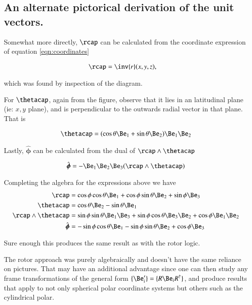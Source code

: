 \documentclass{article}
\newcommand{\phicap}[0]{\hat{\boldsymbol{\phi}}}
\begin{document}
\subsection{ An alternate pictorical derivation of the unit vectors. }

Somewhat more directly, $\rcap$ can be calculated from the coordinate expression of equation \ref{eqn:coordinates}

\begin{align*}
\rcap 
&= \inv{r} (x, y, z),
\end{align*}

which was found by inspection of the diagram.

For $\thetacap$, again from the figure, observe that it lies in an
latitudinal plane (ie: $x,y$ plane), and is perpendicular to the outwards radial vector in that plane.  That is

\begin{align*}
\thetacap 
&= (\cos\theta \Be_1 + \sin\theta \Be_2) \Be_1 \Be_2 \\
\end{align*}

Lastly, $\phicap$ can be calculated from the dual of $\rcap \wedge \thetacap$

\begin{align*}
\phicap 
&= - \Be_1 \Be_2 \Be_3 (\rcap \wedge \thetacap) \\
\end{align*}

Completing the algebra for the expressions above we have
\begin{align}
\rcap 
&=
\cos\phi \cos\theta \Be_1
+ \cos\phi \sin\theta \Be_2
+ \sin\phi \Be_3 \\
\thetacap 
&= \cos\theta \Be_2 - \sin\theta \Be_1 \\
\rcap \wedge \thetacap 
&=
\sin\phi \sin\theta \Be_1 \Be_3 
+ \sin\phi \cos\theta \Be_3 \Be_2 
+ \cos\phi \Be_1 \Be_2 \\
\phicap 
&=
- \sin\phi \cos\theta \Be_1 
- \sin\phi \sin\theta \Be_2 
+ \cos\phi \Be_3 %
\end{align}

Sure enough this produces the same result as with the rotor logic.

The rotor approach was purely algebraically and doesn't have
the same reliance on pictures.  That may have
an 
additional advantage
since one can then 
study any frame transformations of the general form $\{\Be_i'\} = \{ R \Be_i R^\dagger \}$, and produce results 
that apply to 
not only spherical polar coordinate systems but others such as the cylindrical polar.
\end{document}
